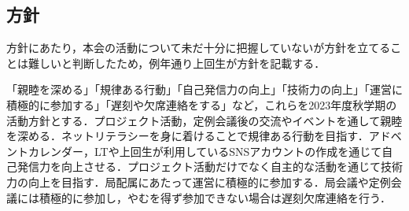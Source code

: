 \subsection*{\firstGrade{}方針}


\firstGrade{}方針にあたり，本会の活動について未だ十分に把握していない\firstGrade{}が方針を立てることは難しいと判断したため，例年通り上回生が\firstGrade{}方針を記載する．

「親睦を深める」「規律ある行動」「自己発信力の向上」「技術力の向上」「運営に積極的に参加する」「遅刻や欠席連絡をする」など，これらを\firstGrade{}2023年度秋学期の活動方針とする．プロジェクト活動，定例会議後の交流やイベントを通して親睦を深める．ネットリテラシーを身に着けることで規律ある行動を目指す．アドベントカレンダー，LTや上回生が利用しているSNSアカウントの作成を通じて自己発信力を向上させる．プロジェクト活動だけでなく自主的な活動を通じて技術力の向上を目指す．局配属にあたって運営に積極的に参加する．局会議や定例会議には積極的に参加し，やむを得ず参加できない場合は遅刻欠席連絡を行う．
